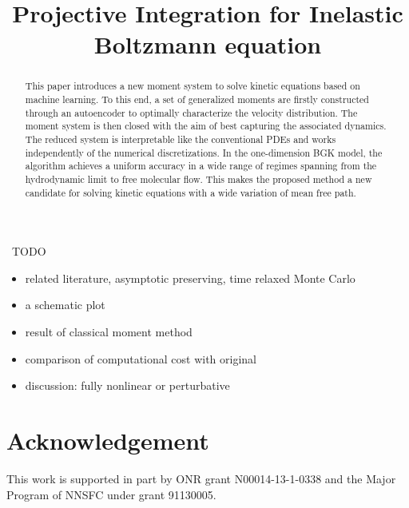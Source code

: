 \documentclass[reqno]{amsart}
\begin{document}
\title{Projective Integration for Inelastic Boltzmann equation}

\begin{abstract}
This paper introduces a new moment system to solve kinetic equations based on machine learning.
To this end, a set of generalized moments are firstly constructed through an autoencoder to optimally characterize the velocity distribution. 
The moment system is then closed with the aim of best capturing the associated dynamics.
The reduced system is interpretable like the conventional PDEs and works independently of the numerical discretizations. 
In the one-dimension BGK model, the algorithm achieves a uniform accuracy in a wide range of regimes spanning from the hydrodynamic limit to free molecular flow. This makes the proposed method a new candidate for solving kinetic equations with a wide variation of mean free path.
\end{abstract}
\maketitle




{ }~\newline TODO
\begin{itemize}
\item related literature, asymptotic preserving, time relaxed Monte Carlo
\item a schematic plot
\item result of classical moment method
\item comparison of computational cost with original
\item discussion: fully nonlinear or perturbative
\end{itemize}


\section*{Acknowledgement}
This work is supported in part by ONR grant N00014-13-1-0338
and the Major Program of NNSFC under grant 91130005.


{}

\end{document}
